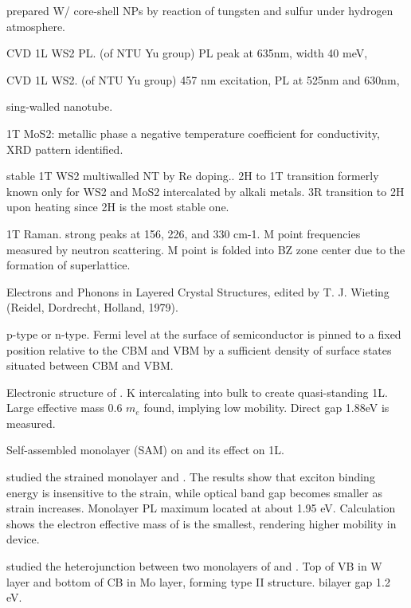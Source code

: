 \citeauthor{Zou2007} prepared W/ core-shell NPs by reaction of tungsten and sulfur under hydrogen atmosphere.\cite{Zou2007}

CVD 1L WS2 PL.\cite{Peimyoo2013} (of NTU Yu group) PL peak at 635nm, width 40 meV, 

CVD 1L WS2.\cite{Cong2013} (of NTU Yu group) 457 nm excitation, PL at 525nm and 630nm, 

 sing-walled nanotube.\cite{Xiao2014}

1T MoS2: metallic phase a negative temperature coefficient for conductivity, XRD pattern identified. \cite{Wypych1992}

stable 1T WS2 multiwalled NT by Re doping.\cite{Enyashin2011}. 2H to 1T transition formerly known only for WS2 and MoS2 intercalated by alkali metals. 3R transition to 2H upon heating since 2H is the most stable one.

1T  Raman.\cite{Yang1991} strong peaks at 156, 226, and 330 cm-1. M point frequencies measured by neutron scattering. M point is folded into BZ zone center due to the formation of superlattice.

Electrons and Phonons in Layered Crystal Structures, edited by T. J. Wieting (Reidel, Dordrecht, Holland, 1979).

 p-type or n-type.  Fermi level at the surface of semiconductor is pinned to a fixed position relative to the CBM and VBM by a sufficient density of surface states situated between CBM and VBM. \cite{Baglio1983}

Electronic structure of .\cite{Eknapakul2014} K intercalating into bulk to create quasi-standing 1L. Large effective mass 0.6 $m_e$ found, implying low mobility. Direct gap 1.88eV is measured.

Self-assembled monolayer (SAM) on  and its effect on  1L.\cite{Najmaei2014}

\citeauthor{Shi2013} studied the strained monolayer  and . The results show that exciton binding energy is insensitive to the strain, while optical band gap becomes smaller as strain increases. Monolayer  PL maximum located at about 1.95 eV. Calculation shows the electron effective mass of  is the smallest, rendering higher mobility in device.\cite{Shi2013}

\citeauthor{Kosmider2013} studied the heterojunction between two monolayers of  and . Top of VB in W layer and bottom of CB in Mo layer, forming type II structure. bilayer gap 1.2 eV.\cite{Kosmider2013}

